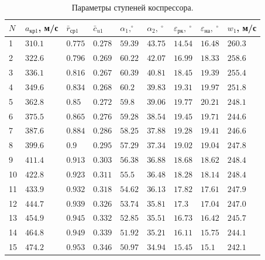 \documentclass[a4paper,12pt]{article}
\begin{document}
     \begin{longtable}{|p{0.6cm}|p{1.2cm}|p{1.2cm}|p{1.2cm}|p{1.2cm}|p{1.2cm}|p{1.2cm}|p{1.2cm}|p{1.2cm}|}
        \caption{Параметры ступеней коспрессора.}\\ \hline
        $N$ & $a_{кр1}$, м/с & $\bar{r}_{ср1}$ & $\bar{c}_{u1}$ & $\alpha_1, ^\circ$ & $\alpha_2,\ ^\circ$ &
        $\varepsilon_{рк},\ ^\circ$ & $\varepsilon_{на},\ ^\circ$ & $w_1$, м/с  \\ \hline
%        
        1 & $310.1$ & $0.775$ &
        $0.278$ & $59.39$ & $43.75$ &
        $14.54$ & $16.48$ &
        $260.3$ \\ \hline
%        
        2 & $322.6$ & $0.796$ &
        $0.269$ & $60.22$ & $42.07$ &
        $16.99$ & $18.33$ &
        $258.6$ \\ \hline
%        
        3 & $336.1$ & $0.816$ &
        $0.267$ & $60.39$ & $40.81$ &
        $18.45$ & $19.39$ &
        $255.4$ \\ \hline
%        
        4 & $349.6$ & $0.834$ &
        $0.268$ & $60.2$ & $39.83$ &
        $19.31$ & $19.97$ &
        $251.8$ \\ \hline
%        
        5 & $362.8$ & $0.85$ &
        $0.272$ & $59.8$ & $39.06$ &
        $19.77$ & $20.21$ &
        $248.1$ \\ \hline
%        
        6 & $375.5$ & $0.865$ &
        $0.276$ & $59.28$ & $38.54$ &
        $19.45$ & $19.71$ &
        $244.6$ \\ \hline
%        
        7 & $387.6$ & $0.884$ &
        $0.286$ & $58.25$ & $37.88$ &
        $19.28$ & $19.41$ &
        $246.6$ \\ \hline
%        
        8 & $399.6$ & $0.9$ &
        $0.295$ & $57.29$ & $37.34$ &
        $19.02$ & $19.04$ &
        $247.8$ \\ \hline
%        
        9 & $411.4$ & $0.913$ &
        $0.303$ & $56.38$ & $36.88$ &
        $18.68$ & $18.62$ &
        $248.4$ \\ \hline
%        
        10 & $422.8$ & $0.923$ &
        $0.311$ & $55.5$ & $36.48$ &
        $18.28$ & $18.14$ &
        $248.4$ \\ \hline
%        
        11 & $433.9$ & $0.932$ &
        $0.318$ & $54.62$ & $36.13$ &
        $17.82$ & $17.61$ &
        $247.9$ \\ \hline
%        
        12 & $444.7$ & $0.939$ &
        $0.326$ & $53.74$ & $35.81$ &
        $17.3$ & $17.04$ &
        $247.0$ \\ \hline
%        
        13 & $454.9$ & $0.945$ &
        $0.332$ & $52.85$ & $35.51$ &
        $16.73$ & $16.42$ &
        $245.7$ \\ \hline
%        
        14 & $464.8$ & $0.949$ &
        $0.339$ & $51.92$ & $35.21$ &
        $16.11$ & $15.75$ &
        $244.1$ \\ \hline
%        
        15 & $474.2$ & $0.953$ &
        $0.346$ & $50.97$ & $34.94$ &
        $15.45$ & $15.1$ &
        $242.1$ \\ \hline
%        
    \end{longtable}
\end{document}
